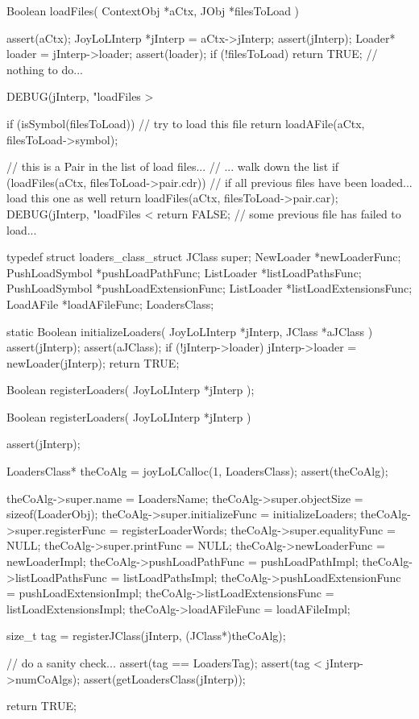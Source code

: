 \starttyping
Boolean loadFiles(
  ContextObj *aCtx,
  JObj   *filesToLoad
) {
  assert(aCtx);
  JoyLoLInterp *jInterp = aCtx->jInterp;
  assert(jInterp);
  Loader* loader = jInterp->loader;
  assert(loader);
  if (!filesToLoad) return TRUE; // nothing to do...

  DEBUG(jInterp, "loadFiles > %

  if (isSymbol(filesToLoad)) { // try to load this file
    return loadAFile(aCtx, filesToLoad->symbol);
  }

  // this is a Pair in the list of load files...
  // ... walk down the list
  if (loadFiles(aCtx, filesToLoad->pair.cdr)) {
    // if all previous files have been loaded... load this one as well
    return loadFiles(aCtx, filesToLoad->pair.car);
  }
  DEBUG(jInterp, "loadFiles < %
  return FALSE; // some previous file has failed to load...
}
\stoptyping

\startTestSuite[regiserLoaders]

\startCHeader
typedef struct loaders_class_struct {
  JClass      super;
  NewLoader      *newLoaderFunc;
  PushLoadSymbol *pushLoadPathFunc;
  ListLoader     *listLoadPathsFunc;
  PushLoadSymbol *pushLoadExtensionFunc;
  ListLoader     *listLoadExtensionsFunc;
  LoadAFile      *loadAFileFunc;
} LoadersClass;
\stopCHeader

\startCCode
static Boolean initializeLoaders(
  JoyLoLInterp *jInterp,
  JClass   *aJClass
) {
  assert(jInterp);
  assert(aJClass);
  if (!jInterp->loader) {
    jInterp->loader = newLoader(jInterp);
  }
  return TRUE;
}
\stopCCode

\startCHeader
Boolean registerLoaders(
  JoyLoLInterp *jInterp
);
\stopCHeader
{}

\startCCode
Boolean registerLoaders(
  JoyLoLInterp *jInterp
) {
  assert(jInterp);
  
  LoadersClass* theCoAlg =
    joyLoLCalloc(1, LoadersClass);
  assert(theCoAlg);
  
  theCoAlg->super.name             = LoadersName;
  theCoAlg->super.objectSize       = sizeof(LoaderObj);
  theCoAlg->super.initializeFunc   = initializeLoaders;
  theCoAlg->super.registerFunc     = registerLoaderWords;
  theCoAlg->super.equalityFunc     = NULL;
  theCoAlg->super.printFunc        = NULL;
  theCoAlg->newLoaderFunc          = newLoaderImpl;
  theCoAlg->pushLoadPathFunc       = pushLoadPathImpl;
  theCoAlg->listLoadPathsFunc      = listLoadPathsImpl;
  theCoAlg->pushLoadExtensionFunc  = pushLoadExtensionImpl;
  theCoAlg->listLoadExtensionsFunc = listLoadExtensionsImpl;
  theCoAlg->loadAFileFunc          = loadAFileImpl;

  size_t tag =
    registerJClass(jInterp, (JClass*)theCoAlg);
  
  // do a sanity check...
  assert(tag == LoadersTag);
  assert(tag < jInterp->numCoAlgs);
  assert(getLoadersClass(jInterp));

  return TRUE;
}
\stopCCode

